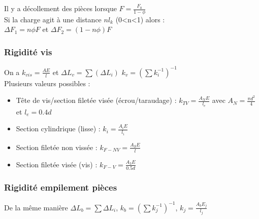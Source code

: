 \documentclass[../main.tex]{subfiles}
\begin{document}
Il y a décollement des pièces lorsque $F = \frac{F_0}{1-\phi}$\\

Si la charge agit à une distance $n l_k$ (0<n<1) alors :\\
$\Delta F_1 = n\phi F$ et $\Delta F_2 = (1-n\phi)F$\\

\subsubsection{Rigidité vis}
On a $k_{vis} = \frac{AE}{l}$ et $\Delta L_v = \sum(\Delta L_i)$ $k_v = (\sum k_i^{-1})^{-1}$\\

Plusieurs valeurs possibles : \\
\begin{itemize}
    \item Tête de vis/section filetée visée (écrou/taraudage) : $k_{TV} = \frac{A_N E}{l_e}$ avec $A_N = \frac{\pi d^2}{4}$ et $l_e = 0.4d$\\
    \item Section cylindrique (lisse) : $k_i = \frac{A_i E}{l_i}$\\
    \item Section filetée non vissée : $k_{F-NV} = \frac{A_S E}{l}$\\
    \item Section filetée visée (vis) : $k_{F-V} = \frac{A_3 E}{0.5 d}$\\
\end{itemize}

\subsubsection{Rigidité empilement pièces}
De la même manière $\Delta L_b = \sum \Delta L_i$, $k_b = (\sum k_j^{-1})^{-1}$, $k_j = \frac{A_b E_j}{l_j}$\\
\end{document}
